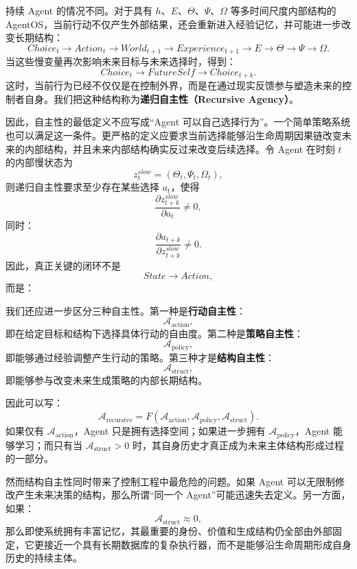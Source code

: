 持续 Agent 的情况不同。对于具有 $h$、$E$、$\Theta$、$\Psi$、$\Omega$ 等多时间尺度内部结构的 AgentOS，当前行动不仅产生外部结果，还会重新进入经验记忆，并可能进一步改变长期结构：
\[
Choice_t
\rightarrow
Action_t
\rightarrow
World_{t+1}
\rightarrow
Experience_{t+1}
\rightarrow
E
\rightarrow
\Theta
\rightarrow
\Psi
\rightarrow
\Omega .
\]
当这些慢变量再次影响未来目标与未来选择时，得到：
\[
Choice_t
\rightarrow
FutureSelf
\rightarrow
Choice_{t+k}.
\]
这时，当前行为已经不仅仅是在控制外界，而是在通过现实反馈参与塑造未来的控制者自身。我们把这种结构称为\textbf{递归自主性（Recursive Agency）}。

因此，自主性的最低定义不应写成“Agent 可以自己选择行为”。一个简单策略系统也可以满足这一条件。更严格的定义应要求当前选择能够沿生命周期因果链改变未来的内部结构，并且未来内部结构确实反过来改变后续选择。令 Agent 在时刻 $t$ 的内部慢状态为
\[
z_t^{slow}
=
(\Theta_t,\Psi_t,\Omega_t),
\]
则递归自主性要求至少存在某些选择 $a_t$，使得
\[
\frac{\partial z_{t+k}^{slow}}{\partial a_t}
\neq 0 ,
\]
同时：
\[
\frac{\partial a_{t+k}}{\partial z_{t+k}^{slow}}
\neq 0 .
\]
因此，真正关键的闭环不是
\[
State\rightarrow Action,
\]
而是：
\begin{statementbox}
\centering
{}
\end{statementbox}

我们还应进一步区分三种自主性。第一种是\textbf{行动自主性}：
\[
\mathcal A_{\mathrm{action}},
\]
即在给定目标和结构下选择具体行动的自由度。第二种是\textbf{策略自主性}：
\[
\mathcal A_{\mathrm{policy}},
\]
即能够通过经验调整产生行动的策略。第三种才是\textbf{结构自主性}：
\[
\mathcal A_{\mathrm{struct}},
\]
即能够参与改变未来生成策略的内部长期结构。

因此可以写：
\[
\mathcal A_{\mathrm{recursive}}
=
F(
\mathcal A_{\mathrm{action}},
\mathcal A_{\mathrm{policy}},
\mathcal A_{\mathrm{struct}}
).
\]
如果仅有 $\mathcal A_{\mathrm{action}}$，Agent 只是拥有选择空间；如果进一步拥有 $\mathcal A_{\mathrm{policy}}$，Agent 能够学习；而只有当 $\mathcal A_{\mathrm{struct}}>0$ 时，其自身历史才真正成为未来主体结构形成过程的一部分。

然而结构自主性同时带来了控制工程中最危险的问题。如果 Agent 可以无限制修改产生未来决策的结构，那么所谓“同一个 Agent”可能迅速失去定义。另一方面，如果：
\[
\mathcal A_{\mathrm{struct}}
\approx 0,
\]
那么即使系统拥有丰富记忆，其最重要的身份、价值和生成结构仍全部由外部固定，它更接近一个具有长期数据库的复杂执行器，而不是能够沿生命周期形成自身历史的持续主体。


